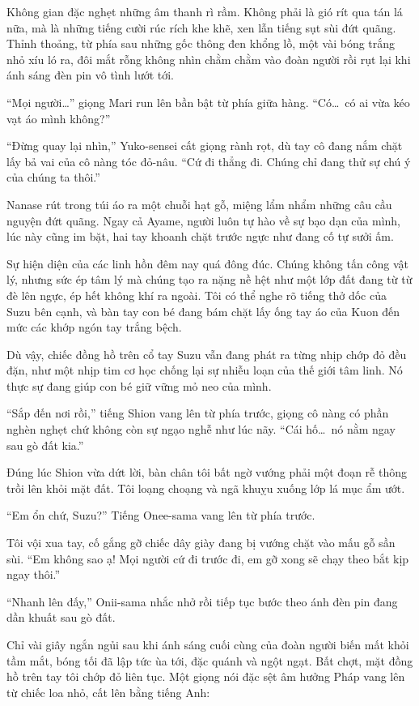 \documentclass[../main.tex]{subfiles}
\begin{document}
Không gian đặc nghẹt những âm thanh rì rầm. Không phải là gió rít qua tán lá nữa, mà là những tiếng cười rúc rích khe khẽ, xen lẫn tiếng sụt sùi đứt quãng. Thỉnh thoảng, từ phía sau những gốc thông đen khổng lồ, một vài bóng trắng nhỏ xíu ló ra, đôi mắt rỗng không nhìn chằm chằm vào đoàn người rồi rụt lại khi ánh sáng đèn pin vô tình lướt tới.

``Mọi người\dots'' giọng Mari run lên bần bật từ phía giữa hàng. ``Có\dots\ có ai vừa kéo vạt áo mình không?''

``Đừng quay lại nhìn,'' Yuko-sensei cất giọng rành rọt, dù tay cô đang nắm chặt lấy bả vai của cô nàng tóc đỏ-nâu. ``Cứ đi thẳng đi. Chúng chỉ đang thử sự chú ý của chúng ta thôi.''

Nanase rút trong túi áo ra một chuỗi hạt gỗ, miệng lẩm nhẩm những câu cầu nguyện đứt quãng. Ngay cả Ayame, người luôn tự hào về sự bạo dạn của mình, lúc này cũng im bặt, hai tay khoanh chặt trước ngực như đang cố tự sưởi ấm.

Sự hiện diện của các linh hồn đêm nay quá đông đúc. Chúng không tấn công vật lý, nhưng sức ép tâm lý mà chúng tạo ra nặng nề hệt như một lớp đất đang từ từ đè lên ngực, ép hết không khí ra ngoài. Tôi có thể nghe rõ tiếng thở dốc của Suzu bên cạnh, và bàn tay con bé đang bám chặt lấy ống tay áo của Kuon đến mức các khớp ngón tay trắng bệch.

Dù vậy, chiếc đồng hồ trên cổ tay Suzu vẫn đang phát ra từng nhịp chớp đỏ đều đặn, như một nhịp tim cơ học chống lại sự nhiễu loạn của thế giới tâm linh. Nó thực sự đang giúp con bé giữ vững mỏ neo của mình.

``Sắp đến nơi rồi,'' tiếng Shion vang lên từ phía trước, giọng cô nàng có phần nghèn nghẹt chứ không còn sự ngạo nghễ như lúc nãy. ``Cái hố\dots\ nó nằm ngay sau gò đất kia.''


Đúng lúc Shion vừa dứt lời, bàn chân tôi bất ngờ vướng phải một đoạn rễ thông trồi lên khỏi mặt đất. Tôi loạng choạng và ngã khuỵu xuống lớp lá mục ẩm ướt.

``Em ổn chứ, Suzu?'' Tiếng Onee-sama vang lên từ phía trước.

Tôi vội xua tay, cố gắng gỡ chiếc dây giày đang bị vướng chặt vào mấu gỗ sần sùi. ``Em không sao ạ! Mọi người cứ đi trước đi, em gỡ xong sẽ chạy theo bắt kịp ngay thôi.''

``Nhanh lên đấy,'' Onii-sama nhắc nhở rồi tiếp tục bước theo ánh đèn pin đang dần khuất sau gò đất.

Chỉ vài giây ngắn ngủi sau khi ánh sáng cuối cùng của đoàn người biến mất khỏi tầm mắt, bóng tối đã lập tức ùa tới, đặc quánh và ngột ngạt. Bất chợt, mặt đồng hồ trên tay tôi chớp đỏ liên tục. Một giọng nói đặc sệt âm hưởng Pháp vang lên từ chiếc loa nhỏ, cất lên bằng tiếng Anh:
\end{document}
